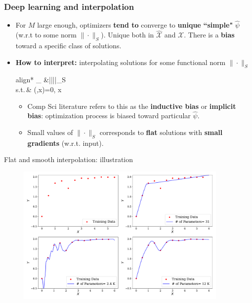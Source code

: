 \documentclass[aspectratio=169,10pt]{beamer}
\newcommand{\emphcolor}[1]{\textbf{\textcolor{emphcolorval}{#1}}}
\newcommand{\Xdom}{\mathcal{X}}
\newcommand{\Xtrain}{\hat{\mathcal{X}}}
\newcommand{\st}{\textrm{s.t.}\,}
\begin{document}
\begin{frame}
	\frametitle{Deep learning and interpolation}
	\begin{itemize}
		\item For $M$ large enough, optimizers \emphcolor{tend to} converge to \emphcolor{unique} \emphcolor{``simple"}  $\hat{\psi}$ (w.r.t to some norm $\|\cdot\|_S$). Unique both in $\Xtrain$ and $\Xdom$. There is a \emphcolor{bias} toward a specific class of solutions.
		\medskip
		\item \emphcolor{How to interpret:} interpolating solutions for some functional norm $\|\cdot\|_S$
		\begin{empheq}[box=\tcbhighmath]{align*}
			\min_{\hat{\psi}\in {}} &||\hat{\psi}||_S\\
			\st & \ell(\hat{\psi},x)=0,\quad {} x \in \Xtrain
		\end{empheq}
		\vspace{-0.1in}
		
		\begin{itemize}
			\item Comp Sci literature refers to this as the \emphcolor{inductive bias} or \emphcolor{implicit bias}: optimization process is biased toward particular $\hat{\psi}$.\smallskip
			\item Small values of $\|\cdot\|_S$ corresponds to \emphcolor{flat} solutions with \emphcolor{small gradients} (w.r.t. input).
			\smallskip
		\end{itemize}
	\end{itemize}
\end{frame}


\begin{frame}{Flat and smooth interpolation:  illustration}
	\begin{figure}[h!]
		\begin{center}
			\includegraphics[height=2.7in]{./figures/smooth_interpolation.pdf}
		\end{center}
	\end{figure}

\end{frame}
\end{document}
